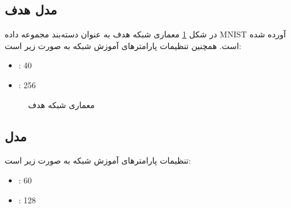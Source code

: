 \subsection{مدل هدف}
در شکل 
\ref{target_model_arch}
معماری شبکه هدف به عنوان دسته‌بند مجموعه‌ داده MNIST آورده شده است. همچنین تنظیمات پارامترهای آموزش شبکه به صورت زیر است:
\begin{itemize}
	\item {}: 40 
	\item {}: 256 
\end{itemize} 
\begin{figure}[H]
	\caption{معماری شبکه هدف}
	\label{target_model_arch}
\end{figure}


\subsection{مدل 
}
تنظیمات پارامترهای آموزش شبکه به صورت زیر است:
\begin{itemize}
	\item {}: 60 
	\item {}: 128 
\end{itemize}

